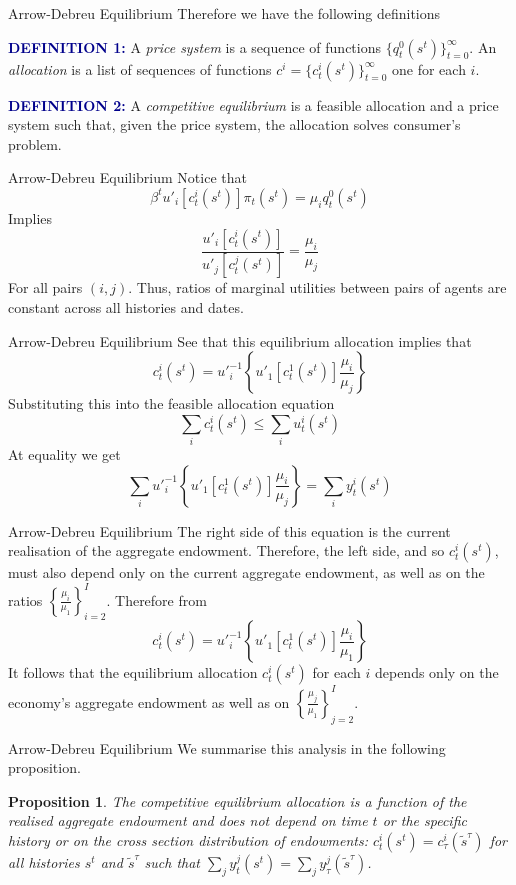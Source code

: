 \documentclass[aspectratio=169,xcolor=dvipsnames]{beamer}
\newtheorem{proposition}{Proposition}
\begin{document}
\begin{frame}{Arrow-Debreu Equilibrium}
    Therefore we have the following definitions

    \textcolor{darkblue}{\textbf{DEFINITION 1:}} A \emph{price system} is a sequence of functions $\{q^0_t(s^t)\}_{t=0}^\infty$. An \emph{allocation} is a list of sequences of functions $c^i = \{c^i_t(s^t)\}_{t=0}^\infty$ one for each $i$.

    \textcolor{darkblue}{\textbf{DEFINITION 2:}} A \emph{competitive equilibrium} is a feasible allocation and a price system such that, given the price system, the allocation solves consumer's problem.
\end{frame}

\begin{frame}{Arrow-Debreu Equilibrium}
    Notice that
    \[
        \beta^t u'_i[c^i_t(s^t)] \pi_t(s^t) = \mu_i q^0_t(s^t)
    \]
    Implies
    \[
        \frac{u'_i[c^i_t(s^t)]}{u'_j[c^j_t(s^t)]} = \frac{\mu_i}{\mu_j}
    \]
    For all pairs $(i, j)$. Thus, ratios of marginal utilities between pairs of agents are constant across all histories and dates.
\end{frame}

\begin{frame}{Arrow-Debreu Equilibrium}
    See that this equilibrium allocation implies that
    \[
        c^i_t(s^t) = u'^{-1}_i \left\{ u'_1[c^1_t(s^t)] \frac{\mu_i}{\mu_j}\right\}
    \]
    Substituting this into the feasible allocation equation
    \[
        \sum_i c^i_t(s^t) \le \sum_i u^i_t(s^t)
    \]
    At equality we get
    \[
        \sum_i u'^{-1}_i \left\{ u'_1[c^1_t(s^t)] \frac{\mu_i}{\mu_j}\right\} = \sum_i y^i_t(s^t)
    \]
\end{frame}

\begin{frame}{Arrow-Debreu Equilibrium}
    The right side of this equation is the current realisation of the aggregate endowment. Therefore, the left side, and so $c^i_t(s^t)$, must also depend only on the current aggregate endowment, as well as on the ratios $\left\{\frac{\mu_i}{\mu_1}\right\}_{i=2}^I$. Therefore from
    \[
        c^i_t(s^t) = u'^{-1}_i \left\{ u'_1[c^1_t(s^t)] \frac{\mu_i}{\mu_1}\right\}
    \]
    It follows that the equilibrium allocation $c^i_t(s^t)$ for each $i$ depends only on the economy's aggregate endowment as well as on $\left\{\frac{\mu_j}{\mu_1}\right\}_{j=2}^I$.
\end{frame}

\begin{frame}{Arrow-Debreu Equilibrium}
    We summarise this analysis in the following proposition.

    \begin{proposition}
        The competitive equilibrium allocation is a function of the realised aggregate endowment and does not depend on time $t$ or the specific history or on the cross section distribution of endowments: $c^i_t(s^t) = c^i_\tau(\tilde s^\tau)$ for all histories $s^t$ and $\tilde s^\tau$ such that $\sum_j y^j_t(s^t) = \sum_j y^j_\tau(\tilde s^\tau)$.
    \end{proposition}
\end{frame}
\end{document}
